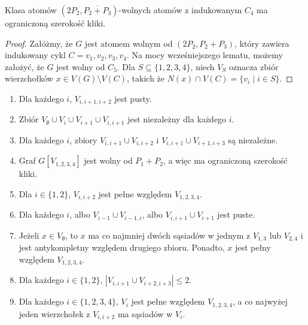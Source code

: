 \documentclass[polish]{beamer}
\begin{document}
\begin{frame}
    \begin{lemma}
        Klasa atomów $(2P_2, \overline{P_2 + P_3})$-wolnych atomów z indukowanym $C_4$ ma ograniczoną szerokość kliki.
    \end{lemma}
    \begin{proof}
        \renewcommand{\qedsymbol}{}
        Załóżmy, że $G$ jest atomem wolnym od $(2P_2, P_2 + P_3)$, który zawiera indukowany cykl $C = v_1, v_2, v_3, v_4$. Na mocy wcześniejszego lematu, możemy założyć, że $G$ jest wolny od $C_5$. Dla $S \subseteq \{1, 2, 3, 4\}$, niech $V_S$ oznacza zbiór wierzchołków $x \in V(G) \setminus V(C)$, takich że $N(x) \cap V(C) = \{v_i \mid i \in S\}$.
    \end{proof}
\end{frame}

\begin{frame}
    \begin{theorem}
        \renewcommand{\qedsymbol}{}
        \begin{enumerate}
            \item Dla każdego $i$, $V_{i,i+1,i+2}$ jest pusty.
            \item Zbiór $V_\emptyset \cup V_i \cup V_{i+1} \cup V_{i,i+1}$ jest niezależny dla każdego $i$.
            \item Dla każdego $i$, zbiory $V_{i,i+1} \cup V_{i,i+2}$ i $V_{i,i+1} \cup V_{i+1,i+3}$ są niezależne.
            \item Graf $G[V_{1,2,3,4}]$ jest wolny od $P_1 + P_2$, a więc ma ograniczoną szerokość kliki.
            \item Dla $i \in \{1,2\}$, $V_{i,i+2}$ jest pełne względem $V_{1,2,3,4}$.
            \item Dla każdego $i$, albo $V_{i-1} \cup V_{i-1,i}$, albo $V_{i,i+1} \cup V_{i+1}$ jest puste.
            \item Jeżeli $x \in V_\emptyset$, to $x$ ma co najmniej dwóch sąsiadów w jednym z $V_{1,3}$ lub $V_{2,4}$ i jest antykompletny względem drugiego zbioru. Ponadto, $x$ jest pełny względem $V_{1,2,3,4}$.
            \item Dla każdego $i \in \{1, 2\}$, $|V_{i,i+1} \cup V_{i+2,i+3}| \leq 2$.
            \item Dla każdego $i \in \{1, 2, 3, 4\}$, $V_i$ jest pełne względem $V_{1,2,3,4}$, a co najwyżej jeden wierzchołek z $V_{i,i+2}$ ma sąsiadów w $V_i$.
        \end{enumerate} 
    \end{theorem}
\end{frame}
\end{document}

